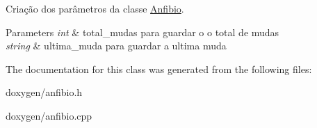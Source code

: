 Criação dos parâmetros da classe \mbox{\hyperlink{class_anfibio}{Anfibio}}. 


\begin{DoxyParams}{Parameters}
{\em int} & total\+\_\+mudas para guardar o o total de mudas \\
\hline
{\em string} & ultima\+\_\+muda para guardar a ultima muda \\
\hline
\end{DoxyParams}


The documentation for this class was generated from the following files\+:\begin{DoxyCompactItemize}
\item 
doxygen/anfibio.\+h\item 
doxygen/anfibio.\+cpp\end{DoxyCompactItemize}
